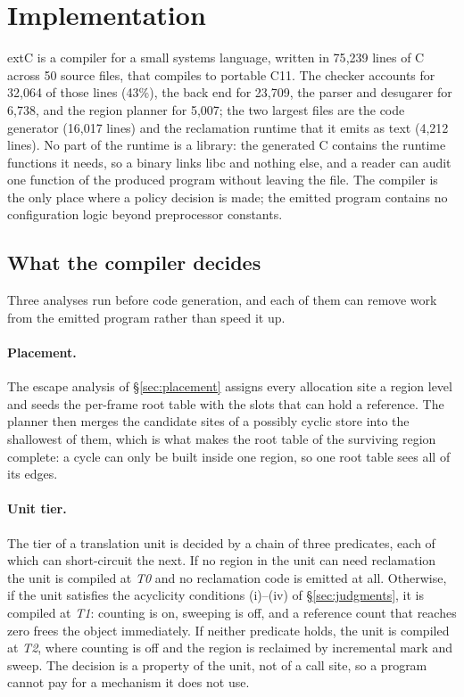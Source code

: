 \section{Implementation}
\label{sec:impl}

extC is a compiler for a small systems language, written in 75{,}239 lines of C across 50
source files, that compiles to portable C11. The checker accounts for 32{,}064 of those lines
(43\%), the back end for 23{,}709, the parser and desugarer for 6{,}738, and the region planner
for 5{,}007; the two largest files are the code generator (16{,}017 lines) and the reclamation
runtime that it emits as text (4{,}212 lines).
No part of the runtime is a library: the generated C contains the runtime functions it needs,
so a binary links libc and nothing else, and a reader can audit one function of the produced
program without leaving the file.  The compiler is the only place where a policy decision is
made; the emitted program contains no configuration logic beyond preprocessor constants.

\subsection{What the compiler decides}
\label{sec:impl-decide}

Three analyses run before code generation, and each of them can remove work from the emitted
program rather than speed it up.

\paragraph{Placement.}
The escape analysis of \S\ref{sec:placement} assigns every allocation site a region level and
seeds the per-frame root table with the slots that can hold a reference.  The planner then
merges the candidate sites of a possibly cyclic store into the shallowest of them, which is what
makes the root table of the surviving region complete: a cycle can only be built inside one
region, so one root table sees all of its edges.

\paragraph{Unit tier.}
The tier of a translation unit is decided by a chain of three predicates, each of which can
short-circuit the next.  If no region in the unit can need reclamation the unit is compiled at
\emph{T0} and no reclamation code is emitted at all.  Otherwise, if the unit satisfies the
acyclicity conditions (i)--(iv) of \S\ref{sec:judgments}, it is compiled at \emph{T1}: counting
is on, sweeping is off, and a reference count that reaches zero frees the object immediately.
If neither predicate holds, the unit is compiled at \emph{T2}, where counting is off and the
region is reclaimed by incremental mark and sweep.  The decision is a property of the unit, not
of a call site, so a program cannot pay for a mechanism it does not use.

